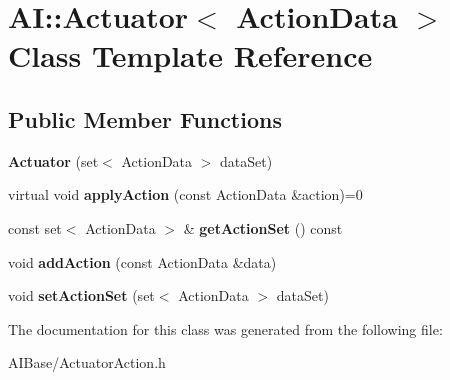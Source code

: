 \hypertarget{classAI_1_1Actuator}{\section{A\-I\-:\-:Actuator$<$ Action\-Data $>$ Class Template Reference}
\label{classAI_1_1Actuator}
}
\subsection*{Public Member Functions}
\begin{DoxyCompactItemize}
\item 
\hypertarget{classAI_1_1Actuator_aa8a8289a0e6cf705deff59ab455b0315}{{\bfseries Actuator} (set$<$ Action\-Data $>$ data\-Set)}\label{classAI_1_1Actuator_aa8a8289a0e6cf705deff59ab455b0315}

\item 
\hypertarget{classAI_1_1Actuator_a286216eeeda770be796192fe549e5a58}{virtual void {\bfseries apply\-Action} (const Action\-Data \&action)=0}\label{classAI_1_1Actuator_a286216eeeda770be796192fe549e5a58}

\item 
\hypertarget{classAI_1_1Actuator_a538ccb2220ddb4e8b15c53771a767a2d}{const set$<$ Action\-Data $>$ \& {\bfseries get\-Action\-Set} () const }\label{classAI_1_1Actuator_a538ccb2220ddb4e8b15c53771a767a2d}

\item 
\hypertarget{classAI_1_1Actuator_a54a31d6d463013d54c7ec9e78c19f2ed}{void {\bfseries add\-Action} (const Action\-Data \&data)}\label{classAI_1_1Actuator_a54a31d6d463013d54c7ec9e78c19f2ed}

\item 
\hypertarget{classAI_1_1Actuator_adbe552dfd0cc9eaed2d27af34d9d6fa1}{void {\bfseries set\-Action\-Set} (set$<$ Action\-Data $>$ data\-Set)}\label{classAI_1_1Actuator_adbe552dfd0cc9eaed2d27af34d9d6fa1}

\end{DoxyCompactItemize}


The documentation for this class was generated from the following file\-:\begin{DoxyCompactItemize}
\item 
A\-I\-Base/Actuator\-Action.\-h\end{DoxyCompactItemize}
